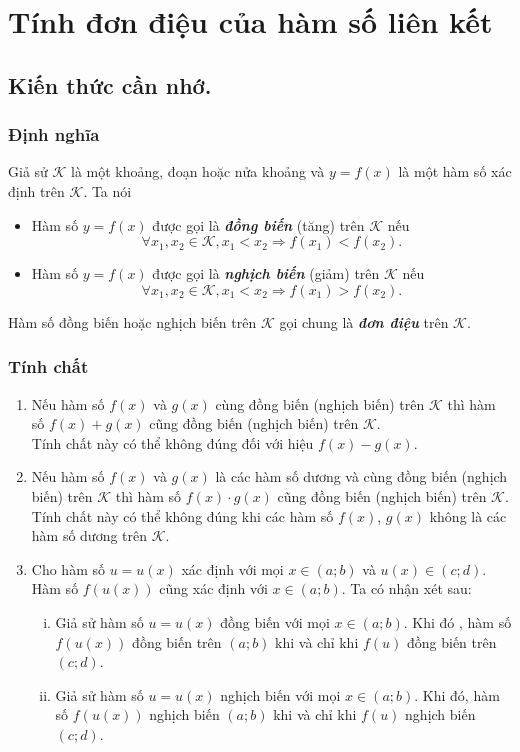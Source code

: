 
\setcounter{ex}{0}
\section{Tính đơn điệu của hàm số liên kết}
\subsection{Kiến thức cần nhớ.}
\begin{khung}
	\subsubsection{Định nghĩa}
	Giả sử $\mathcal{K}$ là một khoảng, đoạn hoặc nửa khoảng và $y=f(x)$ là một hàm số xác định trên $\mathcal{K}$. Ta nói
	\begin{itemize}
		\item Hàm số $y=f(x)$ được gọi là \emph{\textbf{đồng biến}} (tăng) trên $\mathcal{K}$ nếu
		\[\forall x_1,x_2\in \mathcal{K}, x_1<x_2 \Rightarrow f(x_1)<f(x_2).\]
		\item Hàm số $y=f(x)$ được gọi là \emph{\textbf{nghịch biến}} (giảm) trên $\mathcal{K}$ nếu
		\[\forall x_1,x_2\in \mathcal{K}, x_1<x_2 \Rightarrow f(x_1)>f(x_2).\]
	\end{itemize}
	Hàm số đồng biến hoặc nghịch biến trên $\mathcal{K}$ gọi chung là \emph{\textbf{đơn điệu}} trên $\mathcal{K}$.
	
	\subsubsection{Tính chất}
	\begin{enumerate}
		\item Nếu hàm số $f(x)$ và $g(x)$ cùng đồng biến (nghịch biến) trên $\mathcal{K}$ thì hàm số $f(x)+g(x)$ cũng đồng biến (nghịch biến) trên $\mathcal{K}$.\\
		Tính chất này có thể không đúng đối với hiệu $f(x)-g(x)$.
		\item Nếu hàm số $f(x)$ và $g(x)$ là các hàm số dương và cùng đồng biến (nghịch biến) trên $\mathcal{K}$ thì hàm số $f(x)\cdot g(x)$ cũng đồng biến (nghịch biến) trên $\mathcal{K}$.\\
		Tính chất này có thể không đúng khi các hàm số $f(x)$, $g(x)$ không là các hàm số dương trên $\mathcal{K}$.
		\item Cho hàm số $u=u(x)$ xác định với mọi $x\in (a;b)$ và $u(x)\in (c;d)$. Hàm số $f\left(u(x)\right)$ cũng xác định với $x\in (a;b)$. Ta có nhận xét sau:
		\begin{enumerate}[i)]
			\item Giả sử hàm số $u=u(x)$ đồng biến với mọi $x\in (a;b)$. Khi đó , hàm số $f\left(u(x)\right)$ đồng biến trên $ (a;b)$ khi và chỉ khi $f(u)$ đồng biến trên $(c;d)$.
			\item Giả sử hàm số $u=u(x)$ nghịch biến với mọi $x\in (a;b)$. Khi đó, hàm số $f\left(u(x)\right)$ nghịch biến $(a;b)$ khi và chỉ khi $f(u)$ nghịch biến $(c;d)$.
		\end{enumerate}
	\end{enumerate}
	

\end{khung}
